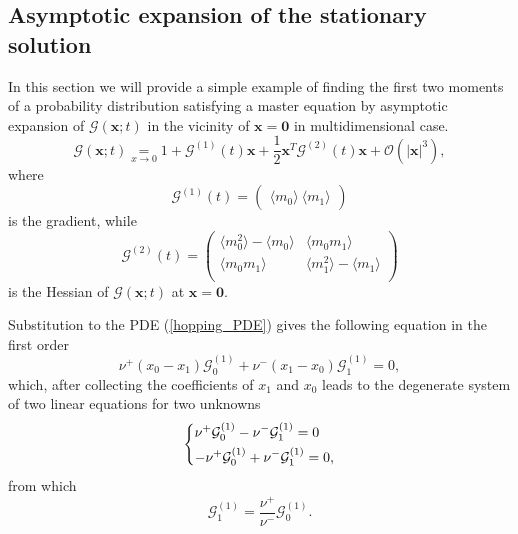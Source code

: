 \documentclass[a4paper, 11pt]{article}
\newcommand\underl[2]{\mathrel{\mathop{#2}\limits_{#1}}}
\begin{document}
\subsection{Asymptotic expansion of the stationary solution}
In this section we will provide a simple example of finding the first two moments of a probability distribution satisfying a master equation by asymptotic expansion of $\mathcal G(\mathbf x; t)$ in the vicinity of $\mathbf x = \mathbf 0$ in multidimensional case.
\begin{equation}\label{eqn:basic_expansion}
  \mathcal G(\mathbf x; t)\underl{x\to 0}{=} 1 + \boldsymbol{\mathcal G}^{(1)}(t)\mathbf x + \frac{1}{2}\mathbf x^T\boldsymbol{\mathcal G}^{(2)}(t)\mathbf x + \mathcal O(|\mathbf x|^3),
\end{equation}
where
\begin{equation*}
  \boldsymbol{\mathcal G}^{(1)}(t) =
  \begin{pmatrix}
    \langle m_0\rangle\ 
    \langle m_1 \rangle
  \end{pmatrix}
\end{equation*}
is the gradient, while
\begin{equation*}
  \boldsymbol{\mathcal G}^{(2)}(t) =
  \left( \begin{array}{cc}
    \langle m_0^2 \rangle - \langle m_0\rangle & \langle m_0m_1\rangle\\
    \langle m_0m_1\rangle & \langle m_1^2 \rangle - \langle m_1\rangle \\
  \end{array} \right)
\end{equation*}
is the Hessian of $\mathcal G(\mathbf x; t)$ at $\mathbf x = \mathbf 0$.

Substitution to the PDE (\ref{hopping_PDE}) gives the following equation in the first order
\begin{equation*}
  \nu^+(x_0-x_1)\mathcal G_0^{(1)} + \nu^-(x_1-x_0)\mathcal G_1^{(1)}=0,
\end{equation*}
which, after collecting the coefficients of $x_1$ and $x_0$ leads to the degenerate system of two linear equations for two unknowns
\begin{equation*}
  \begin{dcases}
    \nu^+\mathcal G_0^{(1)} - \nu^-\mathcal G_1^{(1)} = 0\\
    -\nu^+\mathcal G_0^{(1)} + \nu^-\mathcal G_1^{(1)} = 0,
  \end{dcases}
\end{equation*}
from which
\begin{equation*}
  \mathcal G_1^{(1)} = \frac{\nu^+}{\nu^-}\mathcal G_0^{(1)}.
\end{equation*}
\end{document}
